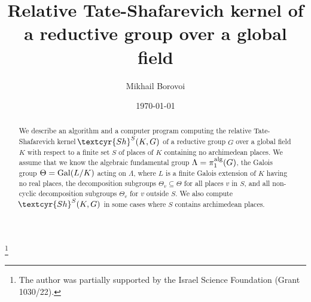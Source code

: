 \documentclass[11pt]{amsart}
\newcommand{\Sha}{{\!\textcyr{Sh}}}
\theoremstyle{plain}
\theoremstyle{definition}
\newcommand{\Gal}{{\rm Gal}}
\newcommand{\alg}{{\rm alg}}
\begin{document}
\title[Relative Tate-Shafarevich kernel]%
{Relative Tate-Shafarevich kernel
of a reductive group over  a global field}

\author{Mikhail Borovoi}


\address{School of Mathematical Sciences,
       Tel Aviv University, 6997801 Tel Aviv, Israel}




\thanks{ The author was partially supported
by the Israel Science Foundation (Grant 1030/22).
}










\date{\today}

\begin{abstract}

We describe an algorithm and a computer program computing the
relative Tate-Shafarevich kernel $\Sha^S(K,G)$
of a reductive group $G$ over a global field $K$
with respect to a finite set $S$ of places of $K$ containing no archimedean places.
We assume  that we know the algebraic fundamental group $\Lambda=\pi_1^\alg(G)$,
the Galois group $\Theta=\Gal(L/K)$ acting on $\Lambda$, where $L$
is a finite Galois extension of $K$ having no real places,
the decomposition subgroups $\Theta_v\subseteq \Theta$ for all places $v$ in $S$,
and all non-cyclic decomposition subgroups $\Theta_v$ for $v$ outside $S$.
We also compute $\Sha^S(K,G)$  in some cases where $S$ contains archimedean places.



\end{abstract}

\end{document}
